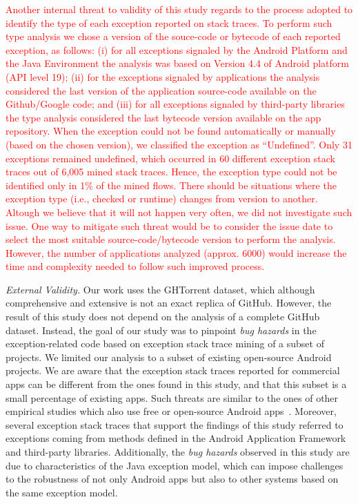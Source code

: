 \textcolor{red}{Another internal threat to validity of this study regards to the process adopted to 
identify the type of each exception reported on stack traces. 
To perform such type analysis we chose a version of the souce-code or bytecode
 of each reported exception, as follows: (i) for all exceptions signaled by the Android Platform 
and the Java Environment the analysis was based on Version 4.4 of Android platform (API level 19);  (ii) 
for the exceptions signaled by applications the analysis considered
the last version of the application source-code available on the Github/Google code; and (iii) 
for all exceptions signaled by third-party libraries the type analysis
considered the last bytecode version available on the app repository.
When the exception could not be found automatically or manually (based on the chosen version), 
we classified the exception as ``Undefined''.  Only 31 exceptions 
remained undefined, which occurred in 60 different exception stack traces out of 6,005 mined stack traces.
Hence, the exception type could not be identified only in 1\% of the mined flows.
There should be situations where the exception type (i.e., checked or runtime) changes from version to another. 
Altough we believe that it will not happen very often, we did not investigate such issue.
 One way to mitigate such threat would be to consider the issue date to select the most 
suitable source-code/bytecode version to perform the analysis.
However, the number of applications analyzed (approx. 6000) 
would increase the time and complexity needed to follow such improved process.}

\emph{External Validity.} Our work uses the GHTorrent dataset, which although 
comprehensive and extensive is not an exact replica of GitHub. 
However, the result of this study does not depend on the analysis of
a complete GitHub dataset. Instead, the goal of our study was to 
pinpoint \emph{bug hazards} in the exception-related code based on 
exception stack trace mining of a subset of projects.
We limited our analysis to a subset of existing open-source Android projects.
We are aware that the exception stack traces reported 
for commercial apps can be different from the ones found in this study, and that
this subset is a small percentage of existing apps.
Such threats are similar to the ones of other empirical studies 
which also use free or open-source Android apps~\cite{Linar13,McDon13,Ruiz12}.
Moreover, several exception stack traces that support the findings of this study
referred to exceptions coming from methods defined in the Android Application Framework
and third-party libraries.  Additionally,  the \emph{bug hazards} observed in this study are due to
characteristics of the Java exception model, which can impose challenges to 
the robustness of not only Android apps but also to other systems
 based on the same exception model. 


